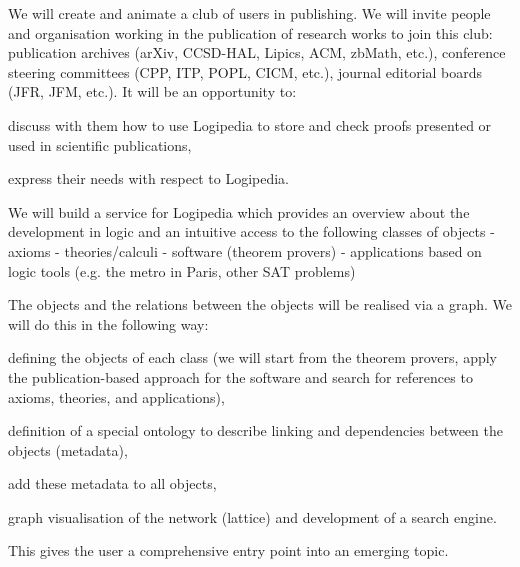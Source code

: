\begin{workpackage}[id=dissemination,type=MGT,wphases=1-48,
  short={Dissemination},
  title={Dissemination, communication and exploitation},
  lead=Lie,LieRM=3,InrRM=6,BirRM=4,CleRM=2,ImtRM=2,StrRM=2,ZibRM=14,EduRM=12]
\begin{tasklist}
\begin{task}[id=teachers-club,
      title=Expanding the use of Logipedia in education,
      shorttitle=Educ.,
      lead=Str,StrRM=2,wphases=1-48!.05]
  \end{task}

  \begin{task}[id=publishers-club,
      title=Expanding the use of Logipedia in publishing,
      shorttitle=Pub.,
      lead=Zib,ZibRM=2,wphases=1-48!.05]
    We will create and animate a club of users in publishing. We will invite
    people and organisation working in the publication of research
    works to join this club: publication archives (arXiv, CCSD-HAL,
    Lipics, ACM, zbMath, etc.), conference steering committees (CPP,
    ITP, POPL, CICM, etc.), journal editorial boards (JFR, JFM,
    etc.). It will be an opportunity to:
    \begin{compactitem}
    \item discuss with them how to use Logipedia to store and check
      proofs presented or used in scientific publications,
    \item express their needs with respect to Logipedia.
    \end{compactitem}
  \end{task}

  \begin{task}[id=zib,
      title=Linking scientific publications to Logipedia,
      shorttitle=Pub. link,
      lead=Zib,ZibRM=12,wphases=12-24]
    We will build a service for Logipedia which provides an overview
    about the development in logic and an intuitive access to the
    following classes of objects - axioms - theories/calculi -
    software (theorem provers) - applications based on logic tools
    (e.g. the metro in Paris, other SAT problems)

    The objects and the relations between the objects will be
    realised via a graph. We will do this in the following way:
    \begin{compactitem}
    \item defining the objects of each class (we will start from the
      theorem provers, apply the publication-based approach for the
      software and search for references to axioms, theories, and
      applications),
    \item definition of a special ontology to describe linking and
      dependencies between the objects (metadata),
    \item add these metadata to all objects,
    \item graph visualisation of the network (lattice) and development
      of a search engine.
    \end{compactitem}
    This gives the user a comprehensive entry point into an emerging
    topic.
  \end{task}


\end{tasklist}
\end{workpackage}
